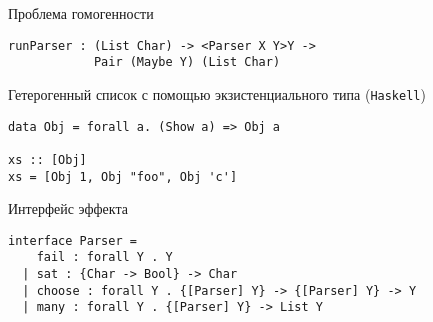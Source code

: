 \begin{frame}[fragile]{}
\begin{block}{Проблема гомогенности}
\begin{verbatim}
runParser : (List Char) -> <Parser X Y>Y ->
            Pair (Maybe Y) (List Char)
\end{verbatim}
\end{block}
\pause
\begin{block}{Гетерогенный список с помощью экзистенциального типа (\texttt{Haskell})}
\begin{verbatim}
data Obj = forall a. (Show a) => Obj a

xs :: [Obj]
xs = [Obj 1, Obj "foo", Obj 'c']
\end{verbatim}
\end{block}
\end{frame}



\begin{frame}[fragile]{}
\begin{block}{Интерфейс эффекта}
\begin{verbatim}
interface Parser =
    fail : forall Y . Y
  | sat : {Char -> Bool} -> Char
  | choose : forall Y . {[Parser] Y} -> {[Parser] Y} -> Y
  | many : forall Y . {[Parser] Y} -> List Y
\end{verbatim}
\end{block}
\end{frame}

